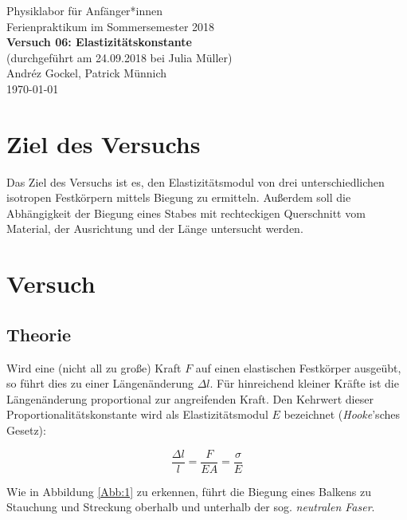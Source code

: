 \documentclass[11pt,a4paper]{article}
\begin{document}
{
\centering 
\large 
Physiklabor für Anf\"anger*innen \\
Ferienpraktikum im Sommersemester 2018 \\[4mm]
\textbf{\LARGE 
Versuch 06: Elastizitätskonstante
} \\[3mm]
(durchgef\"uhrt am 24.09.2018 bei Julia Müller) \\
Andréz Gockel, Patrick M\"unnich\\
\today \\[10mm]
}

\vspace{50pt}
\tableofcontents
\vspace{22pt}
\listoftables
\vspace{22pt}
\listoffigures
\pagebreak
\phantom{lol}
\pagebreak

\section{Ziel des Versuchs}

Das Ziel des Versuchs ist es, den Elastizit\"atsmodul von drei unterschiedlichen isotropen Festk\"orpern mittels Biegung zu ermitteln. Au\ss erdem soll die Abh\"angigkeit der Biegung eines Stabes mit rechteckigen Querschnitt vom Material, der Ausrichtung und der L\"ange untersucht werden.

\section{Versuch}

\subsection{Theorie}

Wird eine (nicht all zu gro\ss e) Kraft $F$ auf einen elastischen Festk\"orper ausge\"ubt, so f\"uhrt dies zu einer L\"angen\"anderung $\Delta l$. F\"ur hinreichend kleiner Kr\"afte ist die L\"angen\"anderung proportional zur angreifenden Kraft. Den Kehrwert dieser Proportionalit\"atskonstante wird als Elastizit\"atsmodul $E$ bezeichnet (\textit{Hooke}'sches Gesetz):

\begin{equation}
\frac{\Delta l}{l}=\frac{F}{EA}=\frac{\sigma}{E}\label{eq:elast}
\end{equation}

Wie in Abbildung \ref{Abb:1} zu erkennen, f\"uhrt die Biegung eines Balkens zu Stauchung und Streckung oberhalb und unterhalb der sog. \textit{neutralen Faser}.
\end{document}
